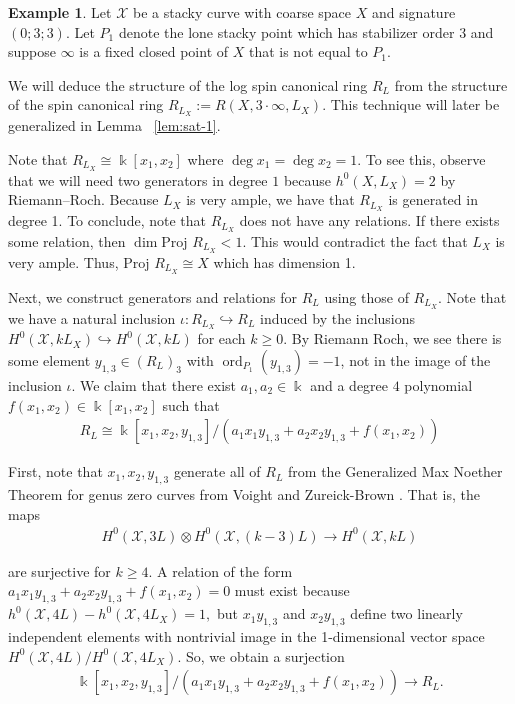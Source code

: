 \documentclass{amsart}
\theoremstyle{plain}
\theoremstyle{definition}
\newtheorem{example}[thm]{Example}
\theoremstyle{remark}
\numberwithin{equation}{section}
\newcommand\Bk{{\Bbbk}}
\newcommand\proj{\text{Proj }}
\DeclareMathOperator{\ord}{ord}
\newcommand\sx{\mathscr X}
\newcommand{\halfcan}{L}
\begin{document}
\begin{example}
\label{eg:adding-point}
Let $\sx$ be a stacky curve with coarse space $X$ and signature $(0
; 3; 3)$. Let $P_1$ denote the lone stacky point which has stabilizer
order $3$ and suppose $\infty$ is a fixed closed point of $X$ that is
not equal to $P_1$.

We will deduce the structure of the log spin canonical ring $R_L$
from the structure of the spin canonical ring $R_{L_X} := R(X, 3
\cdot \infty, L_X)$. This technique will later be generalized in Lemma ~\ref{lem:sat-1}.

Note that $R_{L_X} \cong \Bk[x_1, x_2]$ where $\deg x_1 = \deg x_2 = 1.
$ To see this, observe that we will need two generators in degree $1$
because $h^0(X, L_X) = 2$ by Riemann--Roch. Because $L_X$ is very 
ample, we have that $R_{L_X}$ is generated in degree 1. To
conclude, note that $R_{L_X}$ does not have any relations. If there
exists some relation, then $\dim \proj R_{L_X} < 1$. This would
contradict the fact that $L_X$ is very ample. Thus, $\proj R_{L_X}
\cong X$ which has dimension 1.

Next, we construct generators and relations for $R_L$ using those
of $R_{L_X}$. Note that we have a natural inclusion $\iota: R_{L_X}
\hookrightarrow R_L$ induced by the inclusions $H^0(\sx, k\halfcan_X)
\hookrightarrow H^0(\sx, k\halfcan)$ for each $k \geq 0$. By Riemann Roch,
we see there is some element $y_{1, 3} \in (R_L)_3$ with $\ord_{P_1}
(y_{1, 3}) = -1$, not in the image of the inclusion $\iota$. We
claim that there exist $a_1, a_2 \in \Bk$ and a degree $4$ polynomial
$f(x_1, x_2) \in \Bk[x_1, x_2]$ such that
\begin{align*}
	R_L \cong \Bk[x_1, x_2, y_{1, 3}] / (a_1 x_1 y_{1, 3} + a_2 x_2 y_{1, 3}
	+ f(x_1,x_2))
\end{align*}

First, note that $x_1, x_2, y_{1, 3}$ generate all of $R_L$ from the
Generalized Max Noether Theorem for genus zero curves from Voight
and Zureick-Brown \cite[Lemma 3.1.1]{vzb:stacky}. That is, the maps
\begin{align*}
	H^0(\sx, 3L) \otimes H^0(\sx, (k - 3)L) \rightarrow H^0(\sx, k\halfcan)
\end{align*}

\noindent
are surjective for $k \geq 4$. A relation of the form $a_1 x_1 y_{1,
3} + a_2 x_2 y_{1, 3} + f(x_1, x_2) = 0$ must exist because $h^0(\sx,
4L) - h^0(\sx, 4L_X) = 1,$ but $x_1 y_{1, 3}$ and $x_2 y_{1, 3}$
define two linearly independent elements with nontrivial image in
the 1-dimensional vector space $H^0(\sx, 4L) / H^0(\sx, 4L_X).$ So,
we obtain a surjection
\begin{align}
\label{align:surjection}
	\Bk[x_1, x_2, y_{1, 3}] / (a_1 x_1 y_{1, 3} + a_2 x_2 y_{1, 3} + f(x_1, x_2)) 
	\rightarrow R_L.
\end{align}


\end{example}
\end{document}
